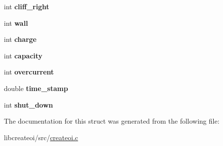\begin{DoxyCompactItemize}
\item 
\hypertarget{structsensor__cache__t_adbe9974277159886ef6f27ced7f1ede9}{int {\bfseries cliff\-\_\-right}}\label{structsensor__cache__t_adbe9974277159886ef6f27ced7f1ede9}

\item 
\hypertarget{structsensor__cache__t_ae8b29aa4393a1ca4a4819fb1dc066803}{int {\bfseries wall}}\label{structsensor__cache__t_ae8b29aa4393a1ca4a4819fb1dc066803}

\item 
\hypertarget{structsensor__cache__t_a84498774b3b608e983bebbc05d91e85e}{int {\bfseries charge}}\label{structsensor__cache__t_a84498774b3b608e983bebbc05d91e85e}

\item 
\hypertarget{structsensor__cache__t_acc0f860402242dcb16ed8f9bf66fb6fd}{int {\bfseries capacity}}\label{structsensor__cache__t_acc0f860402242dcb16ed8f9bf66fb6fd}

\item 
\hypertarget{structsensor__cache__t_a65845bf1754a590dd32ee77307a600f7}{int {\bfseries overcurrent}}\label{structsensor__cache__t_a65845bf1754a590dd32ee77307a600f7}

\item 
\hypertarget{structsensor__cache__t_a28600af0e75d65ed4e04e752380b8e30}{double {\bfseries time\-\_\-stamp}}\label{structsensor__cache__t_a28600af0e75d65ed4e04e752380b8e30}

\item 
\hypertarget{structsensor__cache__t_ae7826ba67a4027cd513a35c66b749194}{int {\bfseries shut\-\_\-down}}\label{structsensor__cache__t_ae7826ba67a4027cd513a35c66b749194}

\end{DoxyCompactItemize}


\-The documentation for this struct was generated from the following file\-:\begin{DoxyCompactItemize}
\item 
libcreateoi/src/\hyperlink{createoi_8c}{createoi.\-c}\end{DoxyCompactItemize}
